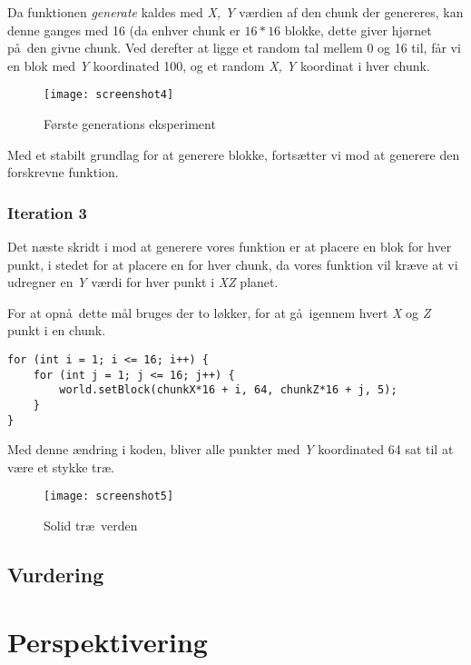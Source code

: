 \documentclass[a4paper,12pt]{report}
\begin{document}
			Da funktionen \emph{generate} kaldes med \emph{X, Y} v\ae rdien af den chunk der genereres, kan
			denne ganges med 16 (da enhver chunk er \(16 * 16\) blokke, dette giver hj\o rnet p\aa \ den givne chunk.
			Ved derefter at ligge et random tal mellem 0 og 16 til, f\aa r vi en blok med \emph{Y} koordinated 100, og et random \emph{X, Y}
			koordinat i hver chunk.

			\begin{wrapfigure}{r}{0.5\textwidth}
				\texttt{[image: screenshot4]}
				\caption{F\o rste generations eksperiment}
			\end{wrapfigure}

			Med et stabilt grundlag for at generere blokke, forts\ae tter vi mod at generere den forskrevne funktion.

		\subsubsection{Iteration 3}
			Det n\ae ste skridt i mod at generere vores funktion er at placere en blok for hver punkt, i stedet for at placere en
			for hver chunk, da vores funktion vil kr\ae ve at vi udregner en \emph{Y} v\ae rdi for hver punkt i \emph{XZ} planet.

			For at opn\aa \ dette m\aa l bruges der to l\o kker, for at g\aa \ igennem hvert \emph{X} og \emph{Z} punkt i en chunk.

\begin{lstlisting}[label=SRPWorldGenerator2,caption=SRPWorldGenerator.java]
for (int i = 1; i <= 16; i++) {
    for (int j = 1; j <= 16; j++) {
        world.setBlock(chunkX*16 + i, 64, chunkZ*16 + j, 5);
    }
}
\end{lstlisting}

			Med denne \ae ndring i koden, bliver alle punkter med \emph{Y} koordinated 64 sat til at v\ae re et stykke tr\ae .

			\begin{wrapfigure}{r}{0.5\textwidth}
				\texttt{[image: screenshot5]}
				\caption{Solid tr\ae \ verden}
			\end{wrapfigure}
	\subsection{Vurdering}
	\section{Perspektivering}
\end{document}
